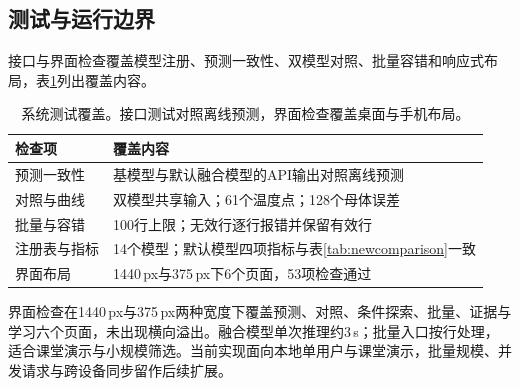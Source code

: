 \subsection{测试与运行边界}
接口与界面检查覆盖模型注册、预测一致性、双模型对照、批量容错和响应式布局，表\ref{tab:app-tests}列出覆盖内容。

\begin{table}[htbp]\centering\small
\caption{系统测试覆盖。接口测试对照离线预测，界面检查覆盖桌面与手机布局。}\label{tab:app-tests}
\begin{tabularx}{\linewidth}{p{2.4cm}X}\toprule
检查项 & 覆盖内容 \\ \midrule
预测一致性 & 基模型与默认融合模型的API输出对照离线预测 \\
对照与曲线 & 双模型共享输入；61个温度点；128个母体误差 \\
批量与容错 & 100行上限；无效行逐行报错并保留有效行 \\
注册表与指标 & 14个模型；默认模型四项指标与表\ref{tab:newcomparison}一致 \\
界面布局 & 1440\,px与375\,px下6个页面，53项检查通过 \\
\bottomrule\end{tabularx}
\end{table}

界面检查在1440\,px与375\,px两种宽度下覆盖预测、对照、条件探索、批量、证据与学习六个页面，未出现横向溢出。融合模型单次推理约3\,s；批量入口按行处理，适合课堂演示与小规模筛选。当前实现面向本地单用户与课堂演示，批量规模、并发请求与跨设备同步留作后续扩展。
